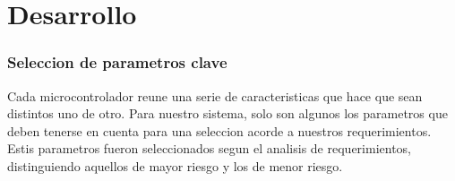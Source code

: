 
\section{Desarrollo} %
\label{it1:sec:desarrollo}


\subsubsection{Seleccion de parametros clave} %
\label{ssub:seleccion_de_parametros_clave}

Cada microcontrolador reune una serie de caracteristicas que hace que sean distintos uno de otro. Para nuestro sistema, solo son algunos los parametros que deben tenerse en cuenta para una seleccion acorde a nuestros requerimientos. Estis parametros fueron seleccionados segun el analisis de requerimientos, distinguiendo aquellos de mayor riesgo y los de menor riesgo. 

